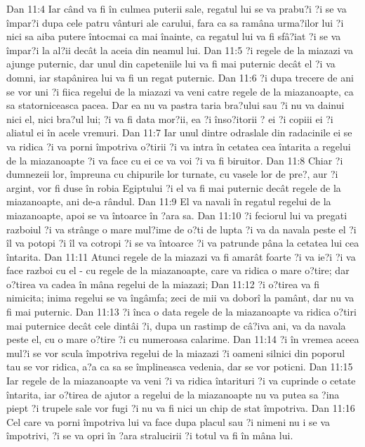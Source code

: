 Dan 11:4  Iar când va fi în culmea puterii sale, regatul lui se va prabu?i ?i se va împar?i dupa cele patru vânturi ale carului, fara ca sa ramâna urma?ilor lui ?i nici sa aiba putere întocmai ca mai înainte, ca regatul lui va fi sfâ?iat ?i se va împar?i la al?ii decât la aceia din neamul lui.
Dan 11:5  ?i regele de la miazazi va ajunge puternic, dar unul din capeteniile lui va fi mai puternic decât el ?i va domni, iar stapânirea lui va fi un regat puternic.
Dan 11:6  ?i dupa trecere de ani se vor uni ?i fiica regelui de la miazazi va veni catre regele de la miazanoapte, ca sa statorniceasca pacea. Dar ea nu va pastra taria bra?ului sau ?i nu va dainui nici el, nici bra?ul lui; ?i va fi data mor?ii, ea ?i înso?itorii ? ei ?i copiii ei ?i aliatul ei în acele vremuri.
Dan 11:7  Iar unul dintre odraslale din radacinile ei se va ridica ?i va porni împotriva o?tirii ?i va intra în cetatea cea întarita a regelui de la miazanoapte ?i va face cu ei ce va voi ?i va fi biruitor.
Dan 11:8  Chiar ?i dumnezeii lor, împreuna cu chipurile lor turnate, cu vasele lor de pre?, aur ?i argint, vor fi duse în robia Egiptului ?i el va fi mai puternic decât regele de la miazanoapte, ani de-a rândul.
Dan 11:9  El va navali în regatul regelui de la miazanoapte, apoi se va întoarce în ?ara sa.
Dan 11:10  ?i feciorul lui va pregati razboiul ?i va strânge o mare mul?ime de o?ti de lupta ?i va da navala peste el ?i îl va potopi ?i îl va cotropi ?i se va întoarce ?i va patrunde pâna la cetatea lui cea întarita.
Dan 11:11  Atunci regele de la miazazi va fi amarât foarte ?i va ie?i ?i va face razboi cu el - cu regele de la miazanoapte, care va ridica o mare o?tire; dar o?tirea va cadea în mâna regelui de la miazazi;
Dan 11:12  ?i o?tirea va fi nimicita; inima regelui se va îngâmfa; zeci de mii va doborî la pamânt, dar nu va fi mai puternic.
Dan 11:13  ?i înca o data regele de la miazanoapte va ridica o?tiri mai puternice decât cele dintâi ?i, dupa un rastimp de câ?iva ani, va da navala peste el, cu o mare o?tire ?i cu numeroasa calarime.
Dan 11:14  ?i în vremea aceea mul?i se vor scula împotriva regelui de la miazazi ?i oameni silnici din poporul tau se vor ridica, a?a ca sa se împlineasca vedenia, dar se vor poticni.
Dan 11:15  Iar regele de la miazanoapte va veni ?i va ridica întarituri ?i va cuprinde o cetate întarita, iar o?tirea de ajutor a regelui de la miazanoapte nu va putea sa ?ina piept ?i trupele sale vor fugi ?i nu va fi nici un chip de stat împotriva.
Dan 11:16  Cel care va porni împotriva lui va face dupa placul sau ?i nimeni nu i se va împotrivi, ?i se va opri în ?ara stralucirii ?i totul va fi în mâna lui.
